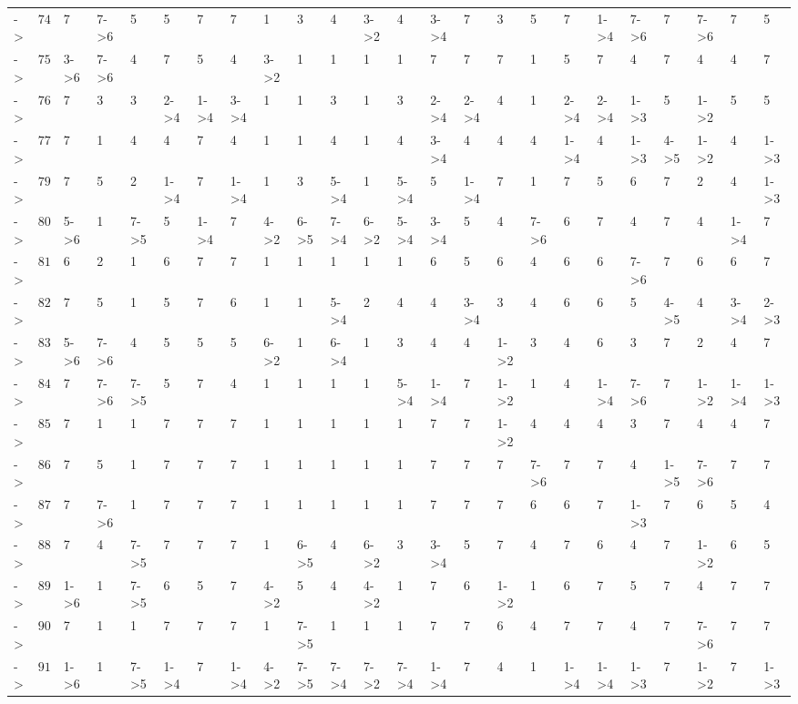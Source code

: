 \documentclass[6pt]{article}
\begin{document}
\begin{landscape}
{\begin{longtable}{lrllllllllllllllllllllll}
-\textgreater &$ 74$&7&7-\textgreater 6&5&5&7&7&1&3&4&3-\textgreater 2&4&3-\textgreater 4&7&3&5&7&1-\textgreater 4&7-\textgreater 6&7&7-\textgreater 6&7&5\tabularnewline
-\textgreater &$ 75$&3-\textgreater 6&7-\textgreater 6&4&7&5&4&3-\textgreater 2&1&1&1&1&7&7&7&1&5&7&4&7&4&4&7\tabularnewline
-\textgreater &$ 76$&7&3&3&2-\textgreater 4&1-\textgreater 4&3-\textgreater 4&1&1&3&1&3&2-\textgreater 4&2-\textgreater 4&4&1&2-\textgreater 4&2-\textgreater 4&1-\textgreater 3&5&1-\textgreater 2&5&5\tabularnewline
-\textgreater &$ 77$&7&1&4&4&7&4&1&1&4&1&4&3-\textgreater 4&4&4&4&1-\textgreater 4&4&1-\textgreater 3&4-\textgreater 5&1-\textgreater 2&4&1-\textgreater 3\tabularnewline
-\textgreater &$ 79$&7&5&2&1-\textgreater 4&7&1-\textgreater 4&1&3&5-\textgreater 4&1&5-\textgreater 4&5&1-\textgreater 4&7&1&7&5&6&7&2&4&1-\textgreater 3\tabularnewline
-\textgreater &$ 80$&5-\textgreater 6&1&7-\textgreater 5&5&1-\textgreater 4&7&4-\textgreater 2&6-\textgreater 5&7-\textgreater 4&6-\textgreater 2&5-\textgreater 4&3-\textgreater 4&5&4&7-\textgreater 6&6&7&4&7&4&1-\textgreater 4&7\tabularnewline
-\textgreater &$ 81$&6&2&1&6&7&7&1&1&1&1&1&6&5&6&4&6&6&7-\textgreater 6&7&6&6&7\tabularnewline
-\textgreater &$ 82$&7&5&1&5&7&6&1&1&5-\textgreater 4&2&4&4&3-\textgreater 4&3&4&6&6&5&4-\textgreater 5&4&3-\textgreater 4&2-\textgreater 3\tabularnewline
-\textgreater &$ 83$&5-\textgreater 6&7-\textgreater 6&4&5&5&5&6-\textgreater 2&1&6-\textgreater 4&1&3&4&4&1-\textgreater 2&3&4&6&3&7&2&4&7\tabularnewline
-\textgreater &$ 84$&7&7-\textgreater 6&7-\textgreater 5&5&7&4&1&1&1&1&5-\textgreater 4&1-\textgreater 4&7&1-\textgreater 2&1&4&1-\textgreater 4&7-\textgreater 6&7&1-\textgreater 2&1-\textgreater 4&1-\textgreater 3\tabularnewline
-\textgreater &$ 85$&7&1&1&7&7&7&1&1&1&1&1&7&7&1-\textgreater 2&4&4&4&3&7&4&4&7\tabularnewline
-\textgreater &$ 86$&7&5&1&7&7&7&1&1&1&1&1&7&7&7&7-\textgreater 6&7&7&4&1-\textgreater 5&7-\textgreater 6&7&7\tabularnewline
-\textgreater &$ 87$&7&7-\textgreater 6&1&7&7&7&1&1&1&1&1&7&7&7&6&6&7&1-\textgreater 3&7&6&5&4\tabularnewline
-\textgreater &$ 88$&7&4&7-\textgreater 5&7&7&7&1&6-\textgreater 5&4&6-\textgreater 2&3&3-\textgreater 4&5&7&4&7&6&4&7&1-\textgreater 2&6&5\tabularnewline
-\textgreater &$ 89$&1-\textgreater 6&1&7-\textgreater 5&6&5&7&4-\textgreater 2&5&4&4-\textgreater 2&1&7&6&1-\textgreater 2&1&6&7&5&7&4&7&7\tabularnewline
-\textgreater &$ 90$&7&1&1&7&7&7&1&7-\textgreater 5&1&1&1&7&7&6&4&7&7&4&7&7-\textgreater 6&7&7\tabularnewline
-\textgreater &$ 91$&1-\textgreater 6&1&7-\textgreater 5&1-\textgreater 4&7&1-\textgreater 4&4-\textgreater 2&7-\textgreater 5&7-\textgreater 4&7-\textgreater 2&7-\textgreater 4&1-\textgreater 4&7&4&1&1-\textgreater 4&1-\textgreater 4&1-\textgreater 3&7&1-\textgreater 2&7&1-\textgreater 3\tabularnewline

\end{longtable}}
\end{landscape}
\end{document}
